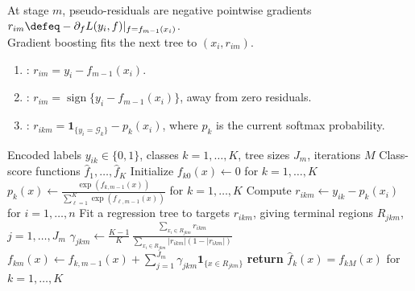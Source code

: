\begin{remark} \label{rem:sl-gradient-boosting-losses} \\
At stage $m$, pseudo-residuals are negative pointwise gradients $r_{im}\defeq-\partial_f L(y_i,f)|_{f=f_{m-1}(x_i)}$.\\
Gradient boosting fits the next tree to $(x_i,r_{im})$.
\begin{enumerate}[label=(\roman*)]
\setlength{\itemsep}{0pt}
\item {}: $r_{im}=y_i-f_{m-1}(x_i)$.
\item {}: $r_{im}=\operatorname{sign}\{y_i-f_{m-1}(x_i)\}$, away from zero residuals.
\item {}: $r_{ikm}=\mathbf{1}_{\{y_i=\mathcal G_k\}}-p_k(x_i)$, where $p_k$ is the current softmax probability.
\end{enumerate}
\end{remark}

\begin{breakablealgorithm}
\caption{Gradient Boosting for $K$-Class Classification}
\label{alg:sl-multiclass-gradient-boosting}
\begin{algorithmic}
\Require Encoded labels $y_{ik}\in\{0,1\}$, classes $k=1,\ldots,K$, tree sizes $J_m$, iterations $M$
\Ensure Class-score functions $\widehat{f}_1,\ldots,\widehat{f}_K$
\State Initialize $f_{k0}(x)\gets0$ for $k=1,\ldots,K$
\State $\displaystyle p_k(x)\gets\frac{\exp(f_{k,m-1}(x))}{\sum_{\ell=1}^K\exp(f_{\ell,m-1}(x))}$ for $k=1,\ldots,K$
\State Compute $r_{ikm}\gets y_{ik}-p_k(x_i)$ for $i=1,\ldots,n$
\State Fit a regression tree to targets $r_{ikm}$, giving terminal regions $R_{jkm}$, $j=1,\ldots,J_m$
\State $\displaystyle \gamma_{jkm}\gets
\frac{K-1}{K}\,
\frac{\sum_{x_i\in R_{jkm}} r_{ikm}}
{\sum_{x_i\in R_{jkm}} |r_{ikm}|(1-|r_{ikm}|)}$
\EndFor
\State $\displaystyle f_{km}(x)\gets f_{k,m-1}(x)+\sum_{j=1}^{J_m}\gamma_{jkm}\mathbf{1}_{\{x\in R_{jkm}\}}$
\EndFor
\EndFor
\State \textbf{return} $\widehat{f}_k(x)=f_{kM}(x)$ for $k=1,\ldots,K$
\end{algorithmic}
\end{breakablealgorithm}

